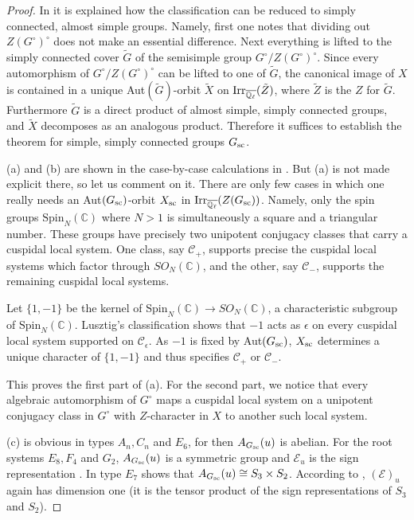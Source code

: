 \documentclass[11pt]{amsart}
\theoremstyle{definition}
\newcommand{\mr}{\mathrm}
\newcommand{\Q}{\mathbb Q}
\newcommand{\C}{\mathbb C}
\def\Irr{{\rm Irr}}
\def\cC{{\mathcal C}}
\def\cE{{\mathcal E}}
\def\sc{{\rm sc}}
\begin{document}
\begin{proof}
In \cite[\S 2.10]{Lus1} it is explained how the classification can be reduced to 
simply connected, almost simple groups. Namely, first one notes that dividing out 
$Z(G^\circ)^\circ$ does not make an essential difference. Next everything is lifted 
to the simply connected cover $\tilde G$ of the semisimple group $G^\circ / 
Z(G^\circ)^\circ$. Since every automorphism of $G^\circ / Z(G^\circ)^\circ$ can be
lifted to one of $\tilde G$, the canonical image of $X$ is contained in a unique 
Aut$(\tilde G)$-orbit $\tilde X$ on $\Irr_{\overline{\Q_\ell}}(\tilde Z)$, where 
$\tilde Z$ is the $Z$ for $\tilde G$. Furthermore $\tilde G$ is a direct product of 
almost simple, simply connected groups, and $\tilde X$ decomposes as an analogous
product. Therefore it suffices to establish the theorem for simple, simply connected 
groups $G_{\sc}$.

(a) and (b) are shown in the case-by-case calculations in \cite[\S 10 and \S 14--15]{Lus1}.
But (a) is not made explicit there, so let us comment on it. There are only few cases in
which one really needs an Aut$(G_\sc)$-orbit $X_\sc$ in $\Irr_{\overline{\Q_\ell}}(Z(G_\sc))$.
Namely, only the spin groups $\mr{Spin}_N (\C)$ where $N > 1$ is simultaneously a square and 
a triangular number. These groups have precisely two unipotent conjugacy classes that carry a 
cuspidal local system. One class, say $\cC_+$, supports precise the cuspidal local systems 
which factor through $SO_N (\C)$, and the other, say $\cC_-$, supports the remaining 
cuspidal local systems.

Let $\{1,-1\}$ be the kernel of $\mr{Spin}_N (\C) \to SO_N (\C)$, a characteristic subgroup 
of $\mr{Spin}_N (\C)$. Lusztig's classification shows that $-1$ acts as $\epsilon$ on every 
cuspidal local system supported on $\cC_\epsilon$. As $-1$ is fixed by Aut$(G_\sc)$, $X_\sc$ 
determines a unique character of $\{1,-1\}$ and thus specifies $\cC_+$ or $\cC_-$.

This proves the first part of (a). For the second part, we notice that every algebraic 
automorphism of $G^\circ$ maps a cuspidal local system on a unipotent conjugacy class in 
$G^\circ$ with $Z$-character in $X$ to another such local system.

(c) is obvious in types $A_n, C_n$ and $E_6$, for then $A_{G_{\sc}} (u)$
is abelian. For the root systems $E_8, F_4$ and $G_2$, $A_{G_{\sc}} (u)$ is a symmetric 
group and $\cE_u$ is the sign representation \cite[\S 15]{Lus1}. In type $E_7$ 
\cite[Table 9]{Miz} shows that $A_{G_{\sc}} (u) \cong S_3 \times S_2$. According
to \cite[\S 15.6]{Lus1}, $(\cE)_u$ again has dimension one (it is the tensor product
of the sign representations of $S_3$ and $S_2$).


\end{proof}
\end{document}
